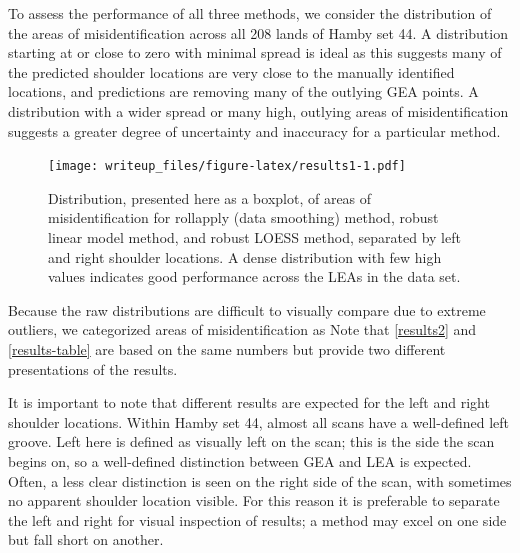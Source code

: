 \documentclass[12pt]{article}
\begin{document}
To assess the performance of all three methods, we consider the
distribution of the areas of misidentification across all 208 lands of
Hamby set 44.
{}
A distribution starting at or close to zero with minimal spread is ideal
as this suggests many of the predicted shoulder locations are very close
to the manually identified locations, and predictions are removing many
of the outlying GEA points. A distribution with a wider spread or many
high, outlying areas of misidentification suggests a greater degree of
uncertainty and inaccuracy for a particular method.
{\color{teal}{Some of the outliers are so extreme, statistics appear very close to one another or on top of each other.}}

\begin{figure}
\centering
\texttt{[image: writeup\_files/figure-latex/results1-1.pdf]}
\caption{\label{results1}Distribution, presented here as a boxplot, of
areas of misidentification for rollapply (data smoothing) method, robust
linear model method, and robust LOESS method, separated by left and
right shoulder locations. A dense distribution with few high values
indicates good performance across the LEAs in the data set.}
\end{figure}

Because the raw distributions are difficult to visually compare due to
extreme outliers, we categorized areas of misidentification as
{}
Note that \autoref{results2} and \autoref{results-table} are based on
the same numbers but provide two different presentations of the results.

It is important to note that different results are expected for the left
and right shoulder locations. Within Hamby set 44, almost all scans have
a well-defined left groove. Left here is defined as visually left on the
scan; this is the side the scan begins on, so a well-defined distinction
between GEA and LEA is expected. Often, a less clear distinction is seen
on the right side of the scan, with sometimes no apparent shoulder
location visible.
{\color{teal}{This may be due to the left shoulder corresponding to the leading edge in the twist of a bullet as it is propelled through a gun barrel.}}
For this reason it is preferable to separate the left and right for
visual inspection of results; a method may excel on one side but fall
short on another.
\end{document}
